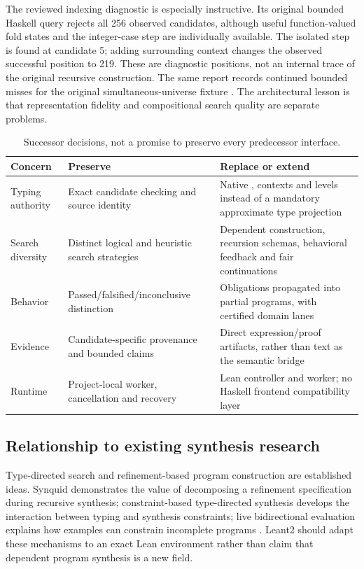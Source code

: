 The reviewed indexing diagnostic is especially instructive. Its original bounded Haskell query rejects all 256 observed candidates, although useful function-valued fold states and the integer-case step are individually available. The isolated step is found at candidate 5; adding surrounding context changes the observed successful position to 219. These are diagnostic positions, not an internal trace of the original recursive construction. The same report records continued bounded misses for the original simultaneous-universe fixture \cite{indexing-report}. The architectural lesson is that representation fidelity and compositional search quality are separate problems.

\begin{table}[ht]
\centering\small
\caption{Successor decisions, not a promise to preserve every predecessor interface.}
\begin{tabularx}{\textwidth}{@{}L{0.24\textwidth}YY@{}}
\toprule
Concern & Preserve & Replace or extend \\
\midrule
Typing authority & Exact candidate checking and source identity & Native , contexts and levels instead of a mandatory approximate type projection \\
Search diversity & Distinct logical and heuristic search strategies & Dependent construction, recursion schemas, behavioral feedback and fair continuations \\
Behavior & Passed/falsified/inconclusive distinction & Obligations propagated into partial programs, with certified domain lanes \\
Evidence & Candidate-specific provenance and bounded claims & Direct expression/proof artifacts, rather than text as the semantic bridge \\
Runtime & Project-local worker, cancellation and recovery & Lean controller and worker; no Haskell frontend compatibility layer \\
\bottomrule
\end{tabularx}
\end{table}

\subsection{Relationship to existing synthesis research}

Type-directed search and refinement-based program construction are established ideas. Synquid demonstrates the value of decomposing a refinement specification during recursive synthesis; constraint-based type-directed synthesis develops the interaction between typing and synthesis constraints; live bidirectional evaluation explains how examples can constrain incomplete programs \cite{synquid,osera,lubin}. Leant2 should adapt these mechanisms to an exact Lean environment rather than claim that dependent program synthesis is a new field.

